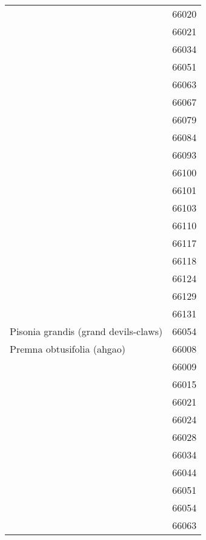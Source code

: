 \begin{longtable}{ll}
                                    & 66020 \\
                                    & 66021 \\
                                    & 66034 \\
                                    & 66051 \\
                                    & 66063 \\
                                    & 66067 \\
                                    & 66079 \\
                                    & 66084 \\
                                    & 66093 \\
                                    & 66100 \\
                                    & 66101 \\
                                    & 66103 \\
                                    & 66110 \\
                                    & 66117 \\
                                    & 66118 \\
                                    & 66124 \\
                                    & 66129 \\
                                    & 66131 \\
\midrule
Pisonia grandis (grand devils-claws) & 66054 \\
\midrule
Premna obtusifolia (ahgao) & 66008 \\
                                    & 66009 \\
                                    & 66015 \\
                                    & 66021 \\
                                    & 66024 \\
                                    & 66028 \\
                                    & 66034 \\
                                    & 66044 \\
                                    & 66051 \\
                                    & 66054 \\
                                    & 66063 \\

\end{longtable}
